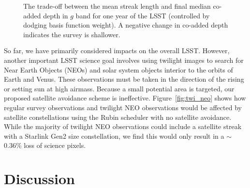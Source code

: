\documentclass[twocolumn]{aastex631}
\begin{document}
\begin{figure}[ht!]
\caption{The trade-off between the mean streak length and final median co-added depth in $g$ band for one year of the LSST (controlled by dodging basis function weight). A negative change in co-added depth indicates the survey is shallower. 
\label{fig-trade-off}}
\end{figure}

So far, we have primarily considered impacts on the overall LSST. However, another important LSST science goal involves using twilight images to search for Near Earth Objects (NEOs) and solar system objects interior to the orbits of Earth and Venus. These observations must be taken in the direction of the rising or setting sun at high airmass. Because a small potential area is targeted, our proposed satellite avoidance scheme is ineffective. Figure~\ref{fig:twi_neo} shows how regular survey observations and twilight NEO observations would be affected by satellite constellations using the Rubin scheduler with no satellite avoidance.  While the majority of twilight NEO observations could include a satellite streak with a Starlink Gen2 size constellation, we find this would only result in a $\sim$0.36\% loss of science pixels.

\begin{figure*}
\centering
{}
\caption{Impacts of satellite streaks on simulated LSST observations without any satellite avoidance. Compared to standard LSST observations (top), twilight NEO observations (bottom) cannot easily be shifted to avoid satellites. The left panels show the altitude and azimuth distribution of observations on the sky, and the right panels show how many streaks would result from the three simulated satellite constellations as a function of how high above the horizon the telescope is pointing (observation altitude). Note that  most twilight NEO observations would contain a satellite streak.
\label{fig:twi_neo}}
\end{figure*}


\section{Discussion}\label{discuss}
\end{document}
